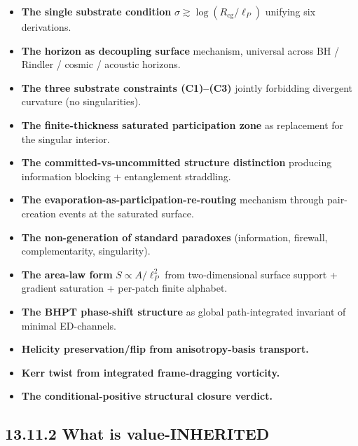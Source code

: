 \documentclass[11pt]{book}
\begin{document}
\begin{itemize}
\item \textbf{The single substrate condition} $\sigma \gtrsim \log(R_\mathrm{cg}/\ell_P)$ unifying six derivations.
\item \textbf{The horizon as decoupling surface} mechanism, universal across BH / Rindler / cosmic / acoustic horizons.
\item \textbf{The three substrate constraints (C1)–(C3)} jointly forbidding divergent curvature (no singularities).
\item \textbf{The finite-thickness saturated participation zone} as replacement for the singular interior.
\item \textbf{The committed-vs-uncommitted structure distinction} producing information blocking + entanglement straddling.
\item \textbf{The evaporation-as-participation-re-routing} mechanism through pair-creation events at the saturated surface.
\item \textbf{The non-generation of standard paradoxes} (information, firewall, complementarity, singularity).
\item \textbf{The area-law form} $S \propto A/\ell_P^2$ from two-dimensional surface support + gradient saturation + per-patch finite alphabet.
\item \textbf{The BHPT phase-shift structure} as global path-integrated invariant of minimal ED-channels.
\item \textbf{Helicity preservation/flip from anisotropy-basis transport.}
\item \textbf{Kerr twist from integrated frame-dragging vorticity.}
\item \textbf{The conditional-positive structural closure verdict.}
\end{itemize}

\subsection{13.11.2 What is value-INHERITED}
\end{document}
